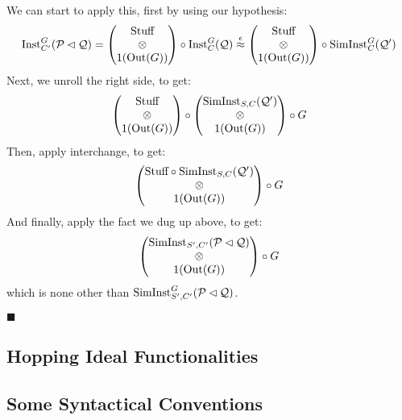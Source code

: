 \begin{theorem}
  We can start to apply this, first by using our hypothesis:
  $$
  \text{Inst}^G_{C'}(\mathcal{P} \lhd \mathcal{Q}) =
  \begin{pmatrix}
    \text{Stuff}\cr
    \otimes\cr
    1(\text{Out}(G))
  \end{pmatrix}
  \circ \text{Inst}^G_C(\mathcal{Q})
  \overset{\epsilon}{\approx}
  \begin{pmatrix}
    \text{Stuff}\cr
    \otimes\cr
    1(\text{Out}(G))
  \end{pmatrix}
  \circ \text{SimInst}^G_C(\mathcal{Q}')
  $$
  Next, we unroll the right side, to get:
  $$
  \begin{pmatrix}
    \text{Stuff}\cr
    \otimes\cr
    1(\text{Out}(G))
  \end{pmatrix}
  \circ
  \begin{pmatrix}
    \text{SimInst}_{S, C}(\mathcal{Q}')\cr
    \otimes\cr
    1(\text{Out}(G))
  \end{pmatrix}
  \circ
  G
  $$
  Then, apply interchange, to get:
  $$
  \begin{pmatrix}
    \text{Stuff} \circ \text{SimInst}_{S, C}(\mathcal{Q}')\cr
    \otimes\cr
    1(\text{Out}(G))
  \end{pmatrix}
  \circ
  G
  $$
  And finally, apply the fact we dug up above, to get:
  $$
  \begin{pmatrix}
    \text{SimInst}_{S', C'}(\mathcal{P} \lhd \mathcal{Q})\cr
    \otimes\cr
    1(\text{Out}(G))
  \end{pmatrix}
  \circ
  G
  $$
  which is none other than $\text{SimInst}^G_{S', C'}(\mathcal{P} \lhd \mathcal{Q})$.

  $\blacksquare$
\end{theorem}

\subsection{Hopping Ideal Functionalities}

\subsection{Some Syntactical Conventions}
